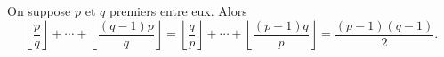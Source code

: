On suppose $p$ et $q$ premiers entre eux. Alors
\[ \left\lfloor \frac{p}{q} \right\rfloor + \cdots + \left\lfloor \frac{(q - 1)p}{q} \right\rfloor = \left\lfloor \frac{q}{p} \right\rfloor + \cdots + \left\lfloor \frac{(p - 1)q}{p} \right\rfloor = \frac{(p - 1)(q - 1)}{2}. \]
